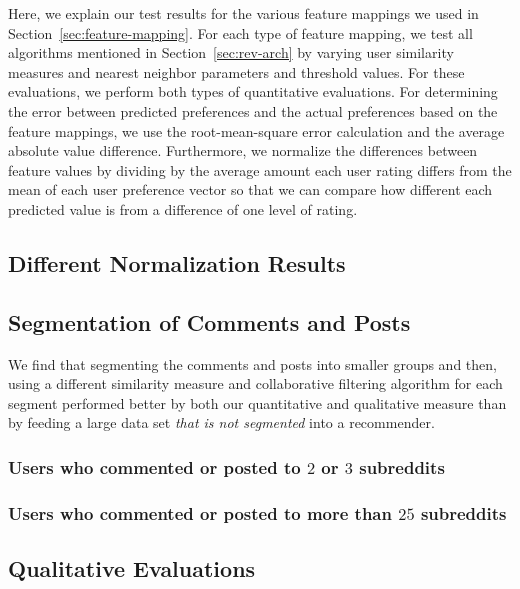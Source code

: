 \documentclass{article}
\begin{document}
Here, we explain our test results for the various feature mappings we used in Section~\ref{sec:feature-mapping}. 
For each type of feature mapping, we test all algorithms mentioned in Section~\ref{sec:rev-arch} by varying user
similarity measures and nearest neighbor parameters and threshold values. For these evaluations, 
we perform both types of quantitative evaluations. For determining the error between predicted preferences and 
the actual preferences based on the feature mappings, we use the root-mean-square error calculation and the average
absolute value difference. Furthermore, we normalize the differences between feature values by dividing by the average
amount each user rating differs from the mean of each user preference vector so that we can compare
how different each predicted value is from a difference of one level of rating. 

\subsection{Different Normalization Results}\label{sec:different-normalization}

\subsection{Segmentation of Comments and Posts}\label{sec:set-com-posts}

We find that segmenting the comments and posts into smaller groups and then, using a different similarity measure
and collaborative filtering algorithm for each segment performed better by both our quantitative and qualitative
measure than by feeding a large data set \emph{that is not segmented} into a recommender.

\subsubsection{Users who commented or posted to $2$ or $3$ subreddits}\label{2-3-users}

\subsubsection{Users who commented or posted to more than $25$ subreddits}\label{more-than-25}

\subsection{Qualitative Evaluations}\label{sec:qualitative-evaluations}


\end{document}
